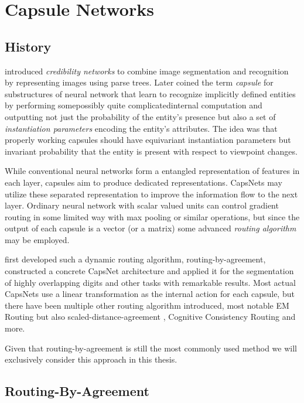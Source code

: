 
\section{Capsule Networks}
\label{sec:capsules}

\subsection{History}

\citet{parse} introduced \emph{credibility networks} to combine image segmentation and recognition by representing images using parse trees.
Later \citet{transformingauto} coined the term \emph{capsule} for substructures of neural network that learn to recognize implicitly defined entities by performing some\textemdash possibly quite complicated\textemdash internal computation and outputting not just the probability of the entity's presence but also a set of \emph{instantiation parameters} encoding the entity's attributes.
The idea was that properly working capsules should have equivariant instantiation parameters but invariant probability that the entity is present with respect to viewpoint changes.

While conventional neural networks form a entangled representation of features in each layer, capsules aim to produce dedicated representations.
CapsNets may utilize these separated representation to improve the information flow to the next layer.
Ordinary neural network with scalar valued units can control gradient routing in some limited way with max pooling or similar operations, but since the output of each capsule is a vector (or a matrix) some advanced \emph{routing algorithm} may be employed.

\citet{capsules} first developed such a dynamic routing algorithm, routing-by-agreement, constructed a concrete CapsNet architecture and applied it for the segmentation of highly overlapping digits and other tasks with remarkable results.
Most actual CapsNets use a linear transformation as the internal action for each capsule, but there have been multiple other routing algorithm introduced, most notable EM Routing \citep{em} but also scaled-distance-agreement \citep{scaledagreement}, Cognitive Consistency Routing \citep{cognitive} and more.

Given that routing-by-agreement is still the most commonly used method we will exclusively consider this approach in this thesis.

\subsection{Routing-By-Agreement}

